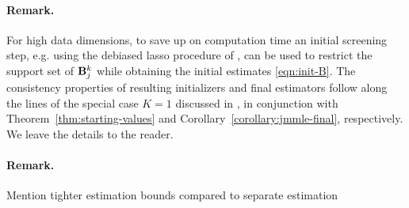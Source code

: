 \paragraph{Remark.}
For high data dimensions, to save up on computation time an initial screening step, e.g. using the debiased lasso procedure of \cite{JavanmardMontanari14}, can be used to restrict the support set of ${\mathbf{B}}_j^k$ while obtaining the initial estimates \eqref{eqn:init-B}. The consistency properties of resulting initializers and final estimators follow along the lines of the special case $K=1$ discussed in \cite{LinEtal16}, in conjunction with Theorem~\ref{thm:starting-values} and Corollary~\ref{corollary:jmmle-final}, respectively. We leave the details to the reader.

\paragraph{Remark.}
{\colrbf Mention tighter estimation bounds compared to separate estimation}